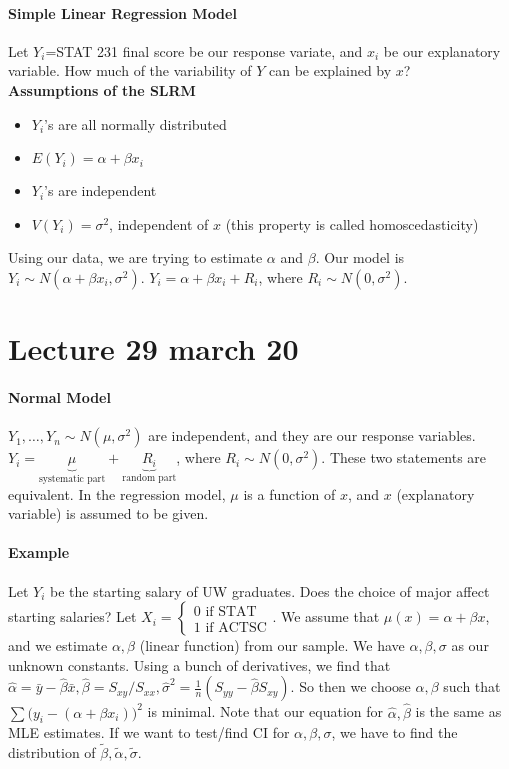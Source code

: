 \documentclass[10pt,letter]{article}
\theoremstyle{plain}
\theoremstyle{definition}
\begin{document}
\paragraph{Simple Linear Regression Model}
Let $Y_i$=STAT 231 final score be our response variate, and $x_i$ be our explanatory variable. How much of the variability of $Y$ can be explained by $x$? \\ 
\textbf{Assumptions of the SLRM}
\begin{itemize}
    \item $Y_i$'s are all normally distributed
    \item $E(Y_i)=\alpha+\beta x_i$ 
    \item $Y_i$'s are independent 
    \item $V(Y_i)=\sigma^2$, independent of $x$ (this property is called homoscedasticity)
\end{itemize}
Using our data, we are trying to estimate $\alpha$ and $\beta$. Our model is $Y_i\sim N(\alpha+\beta x_i,\sigma^2)$. $Y_i=\alpha+\beta x_i+R_i$, where $R_i\sim N(0,\sigma^2)$. 

\section*{Lecture 29 march 20}
\paragraph{Normal Model}
$Y_1,\ldots,Y_n\sim N(\mu,\sigma^2)$ are independent, and they are our response variables. $Y_i=\underbrace{\mu}_{\text{systematic part}}+\underbrace{R_i}_{\text{random part}}$, where $R_i\sim N(0,\sigma^2)$. These two statements are equivalent. In the regression model, $\mu$ is a function of $x$, and $x$ (explanatory variable) is assumed to be given. 
\paragraph{Example}
Let $Y_i$ be the starting salary of UW graduates. Does the choice of major affect starting salaries? Let $X_i=\begin{cases}0\text{ if STAT}\\1\text{ if ACTSC}\end{cases}$. We assume that $\mu(x)=\alpha+\beta x$, and we estimate $\alpha,\beta$ (linear function) from our sample. We have $\alpha,\beta,\sigma$ as our unknown constants. Using a bunch of derivatives, we find that $\hat\alpha=\bar{y}-\hat\beta\bar{x},\hat\beta=S_{xy}/S_{xx},\hat\sigma^2=\frac{1}{n}(S_{yy}-\hat\beta S_{xy})$. So then we choose $\alpha,\beta$ such that $\sum\big(y_i-(\alpha+\beta x_i)\big)^2$ is minimal. Note that our equation for $\hat\alpha,\hat\beta$ is the same as MLE estimates. If we want to test/find CI for $\alpha,\beta,\sigma$, we have to find the distribution of $\tilde{\beta},\tilde{\alpha},\tilde{\sigma}$. 
\end{document}
